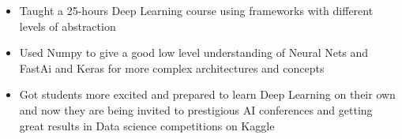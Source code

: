 \documentclass[10pt,a4paper,ragged2e]{altacv}
\begin{document}
    \begin{itemize}
        \item Taught a 25-hours Deep Learning course using frameworks with different levels of abstraction 
        \item Used Numpy to give a good low level understanding of Neural Nets and FastAi and Keras for more complex architectures and concepts
        \item Got students more excited and prepared to learn Deep Learning on their own and now they are being invited to prestigious AI conferences and getting great results in Data science competitions on Kaggle
    \end{itemize}
\smallskip




\clearpage


\nocite{*}






\end{document}
